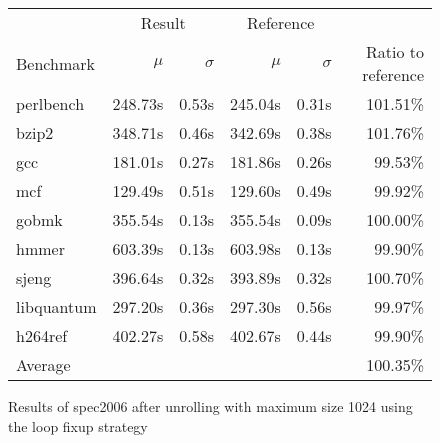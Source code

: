 \begin{figure}[h]
    \begin{center}
        \begin{tabular}{lrrrrr}
            \toprule
            & \multicolumn{2}{c}{Result} & \multicolumn{2}{c}{Reference}\\
            Benchmark & $\mu$ & $\sigma$ & $\mu$ & $\sigma$ & Ratio to reference\\
            \midrule
            perlbench & 248.73s & 0.53s & 245.04s & 0.31s & 101.51\%\\
            bzip2 & 348.71s & 0.46s & 342.69s & 0.38s & 101.76\%\\
            gcc & 181.01s & 0.27s & 181.86s & 0.26s & 99.53\%\\
            mcf & 129.49s & 0.51s & 129.60s & 0.49s & 99.92\%\\
            gobmk & 355.54s & 0.13s & 355.54s & 0.09s & 100.00\%\\
            hmmer & 603.39s & 0.13s & 603.98s & 0.13s & 99.90\%\\
            sjeng & 396.64s & 0.32s & 393.89s & 0.32s & 100.70\%\\
            libquantum & 297.20s & 0.36s & 297.30s & 0.56s & 99.97\%\\
            h264ref & 402.27s & 0.58s & 402.67s & 0.44s & 99.90\%\\
            \midrule
            Average & & & & & 100.35\%\\
            \bottomrule
        \end{tabular}
    \end{center}
    \caption{Results of spec2006 after unrolling with maximum size 1024 using the loop fixup strategy}
    \label{fig:eval:perf:loop:1024}
\end{figure}